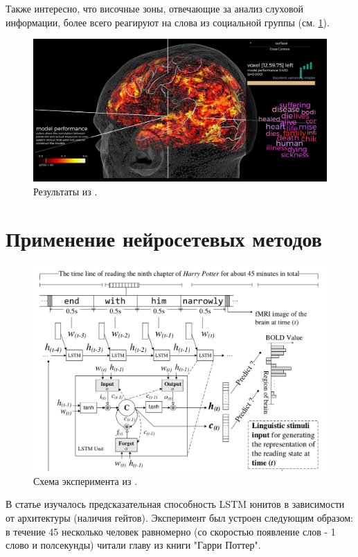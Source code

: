 \documentclass[pdftex,ptm,12pt,a4paper]{report}
\theoremstyle{definition}
\begin{document}
Также интересно, что височные зоны, отвечающие за анализ слуховой информации, более всего реагируют на слова из социальной группы (см. \ref{gallant_visoc}).

\begin{figure}[h]
\includegraphics[scale=0.3]{images/gallant_view1.png}
\centering
\caption{Результаты из \cite{huth2016natural}.}
\label{gallant_visoc}
\end{figure}


\section{Применение нейросетевых методов}

\begin{figure}[h]
\includegraphics[scale=0.3]{images/lstm.png}
\centering
\caption{Схема эксперимента из \cite{qian2016bridging}.}
\label{ch_experiment}
\end{figure}

В статье \cite{qian2016bridging} изучалось предсказательная способность LSTM юнитов в зависимости от архитектуры (наличия гейтов). Эксперимент был устроен следующим образом: в течение 45 несколько человек равномерно (со скоростью появление слов - 1 слово и полсекунды) читали главу из книги "Гарри Поттер".
\end{document}
